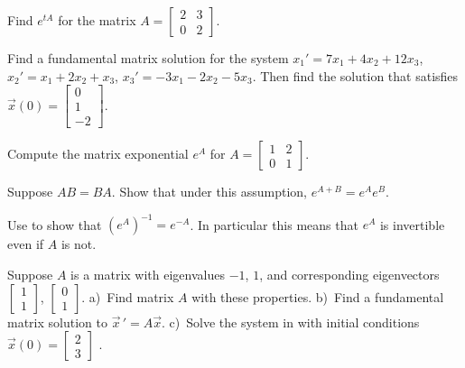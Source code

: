 \documentclass[12pt]{book}
\begin{document}
\begin{exercise}
Find $e^{tA}$ for the matrix $A =
\left[ \begin{smallmatrix}
2 & 3 \\
0 & 2
\end{smallmatrix} \right]$.
\end{exercise}

\begin{exercise}
Find a fundamental matrix solution for the system
$x_1' = 7x_1+4x_2+ 12x_3$,
$x_2' = x_1+2x_2+x_3$,
$x_3' = -3x_1-2x_2- 5x_3$.  Then find the solution that
satisfies $\vec{x}(0) = 
\left[ \begin{smallmatrix} 0 \\ 1 \\ -2 \end{smallmatrix} \right]$.
\end{exercise}

\begin{exercise}
Compute the matrix exponential $e^A$ for
$A = \left[ \begin{smallmatrix} 1 & 2 \\ 0 & 1 \end{smallmatrix} \right]$.
\end{exercise}

\begin{exercise}[challenging] \label{matexp:explawex}
Suppose $AB = BA$.  Show that under this assumption, $e^{A+B} = e^A e^B$.
\end{exercise}

\begin{exercise} \label{matexp:expinvex}
Use 
to show that ${(e^{A})}^{-1} = e^{-A}$.  In particular
this means that $e^A$ is invertible even if $A$ is not.
\end{exercise}

\begin{exercise}
Suppose $A$ is a matrix with eigenvalues $-1$, $1$, and
corresponding eigenvectors
$\left[ \begin{smallmatrix}
1 \\
1
\end{smallmatrix} \right]$,
$\left[ \begin{smallmatrix}
0 \\
1
\end{smallmatrix} \right]$.
a)~Find matrix $A$ with these properties.
b)~Find a fundamental matrix solution to ${\vec{x}\,}' = A \vec{x}$.
c)~Solve the system in with initial conditions $\vec{x}(0) =
\left[ \begin{smallmatrix}
2 \\
3
\end{smallmatrix} \right]$ .
\end{exercise}
\end{document}

